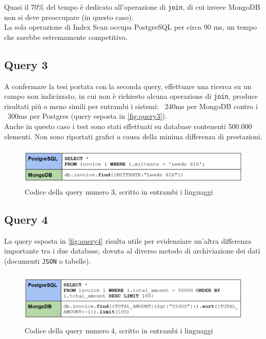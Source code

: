 \noindent Quasi il 70\% del tempo è dedicato all'operazione di \texttt{join}, di cui invece MongoDB non si deve preoccupare (in questo caso).\\
La sola operazione di Index Scan occupa PostgreSQL per circa 90 ms, un tempo che sarebbe estremamente competitivo.\\


\subsection{Query 3}
A confermare la tesi portata con la seconda query, effettuare una ricerca su un campo non indicizzato, in cui non è richiesto alcuna operazione di \texttt{join}, produce risultati più o meno simili per entrambi i sistemi: ~240ms per MongoDB contro i ~300ms per Postgres (query esposta in \autoref{fig:query3}).\\
Anche in questo caso i test sono stati effettuati su database contenenti 500.000 elementi. Non sono riportati grafici a causa della minima differenza di prestazioni.\\

\begin{figure}[htbp]
\begin{center}
\includegraphics[height=5em]{immagini/query/query3.png}
\caption{Codice della query numero 3, scritto in entrambi i linguaggi}
\label{fig:query3}
\end{center}
\end{figure}


\subsection{Query 4}
La query esposta in \autoref{fig:query4} risulta utile per evidenziare un'altra differenza importante tra i due database, dovuta al diverso metodo di archiviazione dei dati (documenti \texttt{JSON} o tabelle).\\

\begin{figure}[htbp]
\begin{center}
\includegraphics[height=7em]{immagini/query/query4.png}
\caption{Codice della query numero 4, scritto in entrambi i linguaggi}
\label{fig:query4}
\end{center}
\end{figure}

